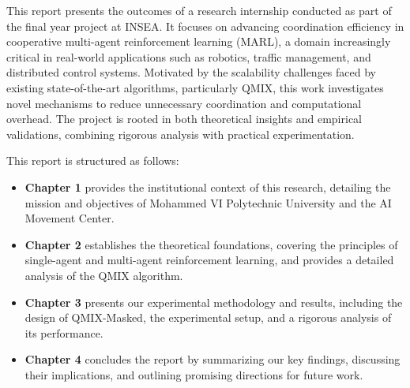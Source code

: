 \documentclass[../Main.tex]{subfiles}
\begin{document}
This report presents the outcomes of a research internship conducted as part of the final year project at INSEA. It focuses on advancing coordination efficiency in cooperative multi-agent reinforcement learning (MARL), a domain increasingly critical in real-world applications such as robotics, traffic management, and distributed control systems. Motivated by the scalability challenges faced by existing state-of-the-art algorithms, particularly QMIX, this work investigates novel mechanisms to reduce unnecessary coordination and computational overhead. The project is rooted in both theoretical insights and empirical validations, combining rigorous analysis with practical experimentation.



This report is structured as follows:
\begin{itemize}
    \item \textbf{Chapter 1} provides the institutional context of this research, detailing the mission and objectives of Mohammed VI Polytechnic University and the AI Movement Center.
    \item \textbf{Chapter 2} establishes the theoretical foundations, covering the principles of single-agent and multi-agent reinforcement learning, and provides a detailed analysis of the QMIX algorithm.
    \item \textbf{Chapter 3} presents our experimental methodology and results, including the design of QMIX-Masked, the experimental setup, and a rigorous analysis of its performance.
    \item \textbf{Chapter 4} concludes the report by summarizing our key findings, discussing their implications, and outlining promising directions for future work.
\end{itemize}
\end{document}

